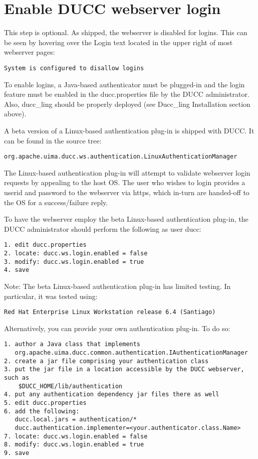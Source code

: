 \section{Enable DUCC webserver login}

    This step is optional.  As shipped, the webserver is disabled for
    logins.  This can be seen by hovering over the Login text located in the
    upper right of most webserver pages: 
\begin{verbatim}
System is configured to disallow logins
\end{verbatim}

    To enable logins, a Java-based authenticator must be plugged-in and the
    login feature must be enabled in the ducc.properties file by the DUCC
    administrator.  Also, ducc\_ling should be properly deployed (see 
    Ducc\_ling Installation section above).
    
    A beta version of a Linux-based authentication plug-in is shipped with DUCC.
    It can be found in the source tree:
\begin{verbatim}
org.apache.uima.ducc.ws.authentication.LinuxAuthenticationManager
\end{verbatim}

    The Linux-based authentication plug-in will attempt to validate webserver
    login requests by appealing to the host OS.  The user who wishes to
    login provides a userid and password to the webserver via https, which
    in-turn are handed-off to the OS for a success/failure reply.
    
    To have the webserver employ the beta Linux-based authentication plug-in,
    the DUCC administrator should perform the following as user ducc:
\begin{verbatim}    
1. edit ducc.properties
2. locate: ducc.ws.login.enabled = false
3. modify: ducc.ws.login.enabled = true
4. save
\end{verbatim}

    Note: The beta Linux-based authentication plug-in has limited testing.
    In particular, it was tested using:
\begin{verbatim}
Red Hat Enterprise Linux Workstation release 6.4 (Santiago)
\end{verbatim}    
    
    Alternatively, you can provide your own authentication plug-in.  To do so:
\begin{verbatim}    
1. author a Java class that implements 
   org.apache.uima.ducc.common.authentication.IAuthenticationManager
2. create a jar file comprising your authentication class
3. put the jar file in a location accessible by the DUCC webserver, such as 
    $DUCC_HOME/lib/authentication
4. put any authentication dependency jar files there as well
5. edit ducc.properties
6. add the following:
   ducc.local.jars = authentication/*
   ducc.authentication.implementer=<your.authenticator.class.Name>
7. locate: ducc.ws.login.enabled = false
8. modify: ducc.ws.login.enabled = true
9. save   
\end{verbatim}    

